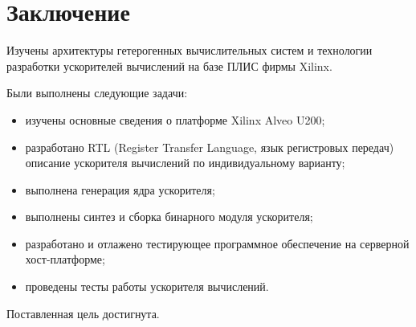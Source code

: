 \chapter*{Заключение}
Изучены архитектуры гетерогенных вычислительных систем и технологии разработки ускорителей вычислений на базе ПЛИС фирмы Xilinx.

Были выполнены следующие задачи:
\begin{itemize}
	\item изучены основные сведения о платформе Xilinx Alveo U200;
	\item разработано RTL (Register Transfer Language, язык регистровых передач) описание ускорителя вычислений по индивидуальному варианту;
	\item выполнена генерация ядра ускорителя;
	\item выполнены синтез и сборка бинарного модуля ускорителя;
	\item разработано и отлажено тестирующее программное обеспечение на серверной хост-платформе;
	\item проведены тесты работы ускорителя вычислений.
\end{itemize}

Поставленная цель достигнута.